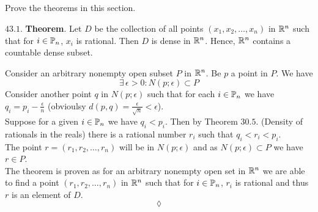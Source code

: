\newpage


\renewcommand{\thesubsection}{\thesection.\arabic{subsection}}
\setcounter{subsection}{0}
\subsection{}
\begin{tcolorbox}
Prove the theorems in this section.
\end{tcolorbox}
\begin{tcolorbox}[colback=white]
$\mathbf{43.1.}$ \textbf{Theorem}. Let $D$ be the collection of all points $(x_1,x_2,\dots,x_n)$ in $\mathbb{R}^n$ such that for $i\in\mathbb{P}_n$, $x_i$ is rational. Then $D$ is dense in $\mathbb{R}^n$. Hence, $\mathbb{R}^n$ contains a countable dense subset.
\end{tcolorbox}
Consider an arbitrary nonempty open subset $P$ in $\mathbb{R}^n$. Be $p$ a point in $P$.
We have
$$\exists\, \epsilon>0: N(p;\epsilon)\subset P$$
Consider another point $q$ in $N(p;\epsilon)$ such that for each $i\in\mathbb{P}_n$ we have $q_i=p_i-\frac{\epsilon}{n}$ (obvioulsy $d(p,q) = \frac{\epsilon}{\sqrt{n}}<\epsilon$).\\
Suppose for a given $i\in\mathbb{P}_n$ we have $q_i<p_i$. Then by 
 Theorem $\mathbf{30.5.}$ (Density of rationals in the reals) there is a rational number $r_i$ such that $q_i<r_i<p_i$.\\
 The point $r= (r_1,r_2,\dots,r_n)$ will be in $N(p;\epsilon)$ and as  $N(p;\epsilon)\subset P$ we have $r\in P$. \\
The theorem is proven as for an arbitrary nonempty open set in $\mathbb{R}^n$ we are able to find a point $(r_1,r_2,\dots,r_n)$ in $\mathbb{R}^n$ such that for $i\in\mathbb{P}_n$, $r_i$ is rational and thus $r$ is an element of $D$.
$$\lozenge$$
\newpage


